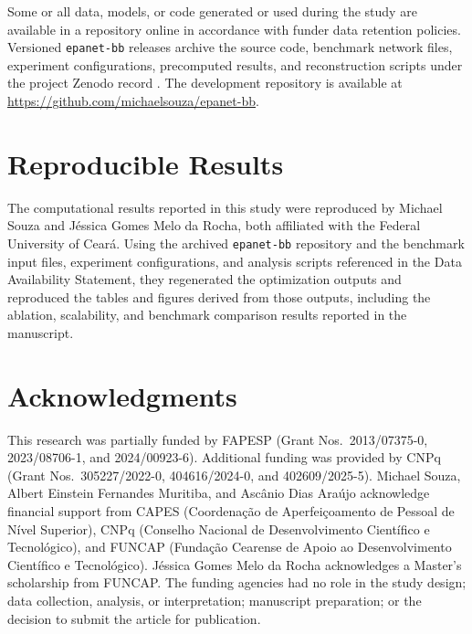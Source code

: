 \documentclass[Journal,letterpaper,InsideFigs]{ascelike-new}
\begin{document}
Some or all data, models, or code generated or used during the study are available in a repository online in accordance with funder data retention policies. Versioned \texttt{epanet-bb} releases archive the source code, benchmark network files, experiment configurations, precomputed results, and reconstruction scripts under the project Zenodo record \cite{epanetbb}. The development repository is available at \url{https://github.com/michaelsouza/epanet-bb}.

\section*{Reproducible Results}

The computational results reported in this study were reproduced by Michael Souza and J\'essica Gomes Melo da Rocha, both affiliated with the Federal University of Cear\'a. Using the archived \texttt{epanet-bb} repository and the benchmark input files, experiment configurations, and analysis scripts referenced in the Data Availability Statement, they regenerated the optimization outputs and reproduced the tables and figures derived from those outputs, including the ablation, scalability, and benchmark comparison results reported in the manuscript.

\section*{Acknowledgments}

This research was partially funded by FAPESP (Grant Nos.\ 2013/07375-0,
2023/08706-1, and 2024/00923-6). Additional funding was provided by CNPq
(Grant Nos.\ 305227/2022-0, 404616/2024-0, and 402609/2025-5).
Michael Souza, Albert Einstein Fernandes Muritiba, and
Asc\^anio Dias Ara\'ujo acknowledge financial support from CAPES
(Coordena\c{c}\~ao de Aperfei\c{c}oamento de Pessoal de N\'ivel Superior),
CNPq (Conselho Nacional de Desenvolvimento Cient\'ifico e Tecnol\'ogico),
and FUNCAP (Funda\c{c}\~ao Cearense de Apoio ao Desenvolvimento Cient\'ifico
e Tecnol\'ogico).
J\'essica Gomes Melo da Rocha acknowledges a Master's scholarship from FUNCAP.
The funding agencies had no role in the study design; data collection, analysis,
or interpretation; manuscript preparation; or the decision to submit the article
for publication.
\end{document}

